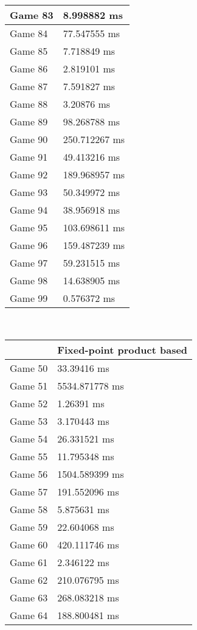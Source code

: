 \begin{multicols}{2}
\begin{tabular}{|l|l|}
	Game 83 & 8.998882 ms \\ \hline
	Game 84 & 77.547555 ms \\ \hline
	Game 85 & 7.718849 ms \\ \hline
	Game 86 & 2.819101 ms \\ \hline
	Game 87 & 7.591827 ms \\ \hline
	Game 88 & 3.20876 ms \\ \hline
	Game 89 & 98.268788 ms \\ \hline
	Game 90 & 250.712267 ms \\ \hline
	Game 91 & 49.413216 ms \\ \hline
	Game 92 & 189.968957 ms \\ \hline
	Game 93 & 50.349972 ms \\ \hline
	Game 94 & 38.956918 ms \\ \hline
	Game 95 & 103.698611 ms \\ \hline
	Game 96 & 159.487239 ms \\ \hline
	Game 97 & 59.231515 ms \\ \hline
	Game 98 & 14.638905 ms \\ \hline
	Game 99 & 0.576372 ms \\ \hline
\end{tabular}\\
\begin{tabular}{|l|l|}
	\hline
	& Fixed-point product based \\ \hline
	Game 50 & 33.39416 ms \\ \hline
	Game 51 & 5534.871778 ms \\ \hline
	Game 52 & 1.26391 ms \\ \hline
	Game 53 & 3.170443 ms \\ \hline
	Game 54 & 26.331521 ms \\ \hline
	Game 55 & 11.795348 ms \\ \hline
	Game 56 & 1504.589399 ms \\ \hline
	Game 57 & 191.552096 ms \\ \hline
	Game 58 & 5.875631 ms \\ \hline
	Game 59 & 22.604068 ms \\ \hline
	Game 60 & 420.111746 ms \\ \hline
	Game 61 & 2.346122 ms \\ \hline
	Game 62 & 210.076795 ms \\ \hline
	Game 63 & 268.083218 ms \\ \hline
	Game 64 & 188.800481 ms \\ \hline

\end{tabular}
\end{multicols}
